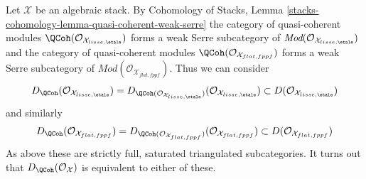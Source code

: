 Let $\mathcal{X}$ be an algebraic stack.
By Cohomology of Stacks, Lemma
\ref{stacks-cohomology-lemma-quasi-coherent-weak-serre}
the category of quasi-coherent modules
$\QCoh(\mathcal{O}_{\mathcal{X}_{lisse,\etale}})$
forms a weak Serre subcategory of
$\textit{Mod}(\mathcal{O}_{\mathcal{X}_{lisse,\etale}})$
and the category of quasi-coherent modules
$\QCoh(\mathcal{O}_{\mathcal{X}_{flat,fppf}})$
forms a weak Serre subcategory of
$\textit{Mod}(\mathcal{O}_{\mathcal{X}_{flat,fppf}})$.
Thus we can consider
$$
D_\QCoh(\mathcal{O}_{\mathcal{X}_{lisse,\etale}}) =
D_{\QCoh(\mathcal{O}_{\mathcal{X}_{lisse,\etale}})}(
\mathcal{O}_{\mathcal{X}_{lisse,\etale}})
\subset
D(\mathcal{O}_{\mathcal{X}_{lisse,\etale}})
$$
and similarly
$$
D_\QCoh(\mathcal{O}_{\mathcal{X}_{flat,fppf}}) =
D_{\QCoh(\mathcal{O}_{\mathcal{X}_{flat,fppf}})}(
\mathcal{O}_{\mathcal{X}_{flat,fppf}})
\subset
D(\mathcal{O}_{\mathcal{X}_{flat,fppf}})
$$
As above these are strictly full, saturated triangulated subcategories.
It turns out that $D_\QCoh(\mathcal{O}_\mathcal{X})$
is equivalent to either of these.

